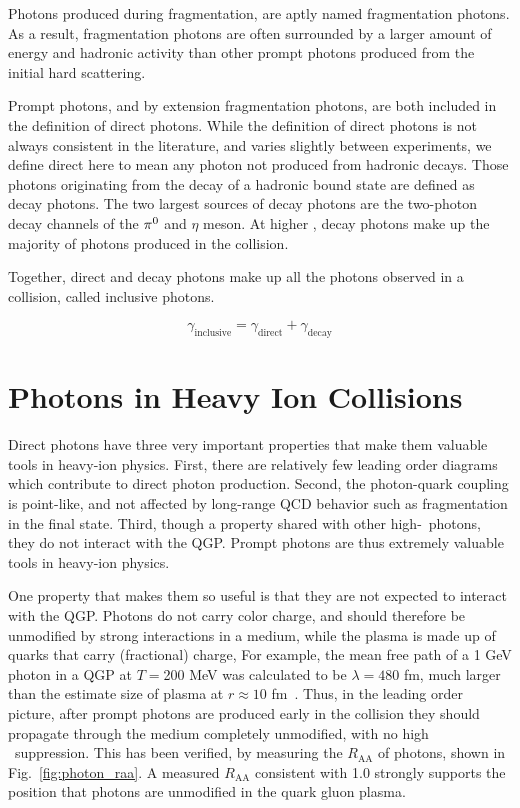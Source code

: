 
Photons produced during fragmentation, are aptly named fragmentation photons. As a result, fragmentation photons are often surrounded by a larger amount of energy and hadronic activity than other prompt photons produced from the initial hard scattering.

Prompt photons, and by extension fragmentation photons, are both included in the definition of direct photons. While the definition of direct photons is not always consistent in the literature, and varies slightly between experiments, we define direct here to mean any photon not produced from hadronic decays. Those photons originating from the decay of a hadronic bound state are defined as decay photons. The two largest sources of decay photons are the two-photon decay channels of the $\pi^0$ and $\eta$ meson. At higher \pt, decay photons make up the majority of photons produced in the collision.

Together, direct and decay photons make up all the photons observed in a collision, called inclusive photons.

\begin{equation}
  \gamma_\mathrm{inclusive} = \gamma_\mathrm{direct} + \gamma_\mathrm{decay}
\end{equation}

\section{Photons in Heavy Ion Collisions}
Direct photons have three very important properties that make them valuable tools in heavy-ion physics. First, there are relatively few leading order diagrams which contribute to direct photon production. Second, the photon-quark coupling is point-like, and not affected by long-range QCD behavior such as fragmentation in the final state. Third, though a property shared with other high-\pt~photons, they do not interact with the QGP. Prompt photons are thus extremely valuable tools in heavy-ion physics. 

One property that makes them so useful is that they are not expected to interact with the QGP. Photons do not carry color charge, and should therefore be unmodified by strong interactions in a medium, while the plasma is made up of quarks that carry (fractional) charge, For example, the mean free path of a 1 GeV photon in a QGP at $T=$200 MeV was calculated to be  $\lambda=480$ fm, much larger than the estimate size of plasma at  $r \approx 10$ fm~\cite{David2020}. Thus, in the leading order picture, after prompt photons are produced early in the collision they should propagate through the medium completely unmodified, with no high \pt~suppression. This has been verified, by measuring the $R_\mathrm{AA}$ of photons, shown in Fig.~\ref{fig:photon_raa}. A measured $R_\mathrm{AA}$ consistent with 1.0 strongly supports the position that photons are unmodified in the quark gluon plasma.

